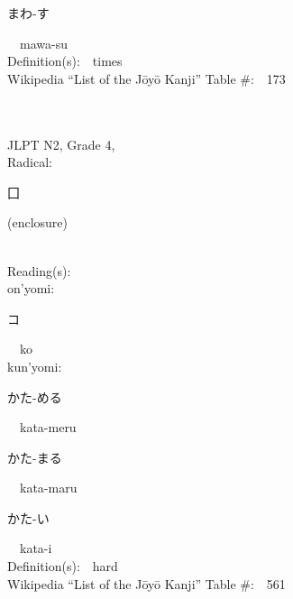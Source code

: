 \begin{multicols}{2}
{\hspace*{2em}}{\begin{CJK}{UTF8}{min} まわ-す \end{CJK}}\ \ mawa-su\ \ \\
Definition(s):\ \ times \\
Wikipedia ``List of the J\=oy\=o Kanji'' Table \#:\ \ 173 \\
\ \ \\
{\fontsize{34pt}{40pt}  }\ \ \\  %
{JLPT N2, Grade 4, \\Radical:\ \ {\begin{CJK}{UTF8}{min} 囗 \end{CJK}} (enclosure) } \\
Reading(s):\ \ \\
{\hspace*{1em}}on'yomi:\ \ \\
{\hspace*{2em}}{\begin{CJK}{UTF8}{min} コ \end{CJK}}\ \ ko\ \ \\
{\hspace*{1em}}kun'yomi:\ \ \\
{\hspace*{2em}}{\begin{CJK}{UTF8}{min} かた-める \end{CJK}}\ \ kata-meru\ \ \\
{\hspace*{2em}}{\begin{CJK}{UTF8}{min} かた-まる \end{CJK}}\ \ kata-maru\ \ \\
{\hspace*{2em}}{\begin{CJK}{UTF8}{min} かた-い \end{CJK}}\ \ kata-i\ \ \\
Definition(s):\ \ hard \\
Wikipedia ``List of the J\=oy\=o Kanji'' Table \#:\ \ 561 \\
\ \ \\
{\fontsize{34pt}{40pt}  }\ \ \\  %

\end{multicols}
